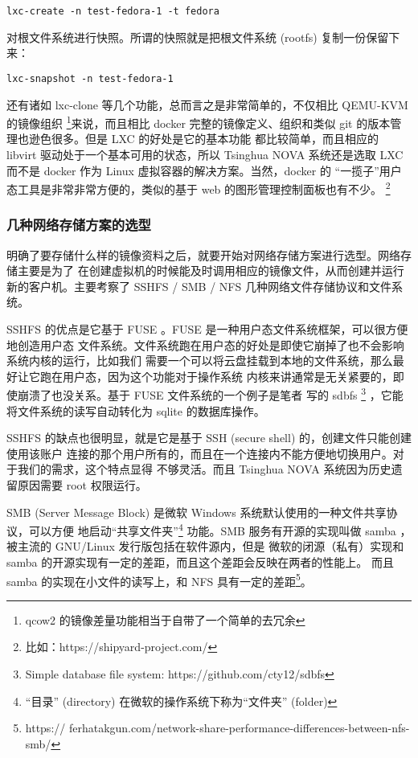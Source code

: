 \begin{lstlisting}
lxc-create -n test-fedora-1 -t fedora
\end{lstlisting}

对根文件系统进行快照。所谓的快照就是把根文件系统 (rootfs) 复制一份保留下来：

\begin{lstlisting}
lxc-snapshot -n test-fedora-1
\end{lstlisting}

还有诸如 lxc-clone 等几个功能，总而言之是非常简单的，不仅相比 QEMU-KVM 的镜像组织
\footnote{qcow2 的镜像差量功能相当于自带了一个简单的去冗余}来说，而且相比 docker
完整的镜像定义、组织和类似 git 的版本管理也逊色很多。但是 LXC 的好处是它的基本功能
都比较简单，而且相应的 libvirt 驱动处于一个基本可用的状态，所以 Tsinghua NOVA
系统还是选取 LXC 而不是 docker 作为 Linux 虚拟容器的解决方案。当然，docker 的
“一揽子”用户态工具是非常非常方便的，类似的基于 web 的图形管理控制面板也有不少。
\footnote{比如：https://shipyard-project.com/}

\subsubsection{几种网络存储方案的选型}
\label{subsubsec:network-storage}

明确了要存储什么样的镜像资料之后，就要开始对网络存储方案进行选型。网络存储主要是为了
在创建虚拟机的时候能及时调用相应的镜像文件，从而创建并运行新的客户机。主要考察了
SSHFS / SMB / NFS 几种网络文件存储协议和文件系统。

SSHFS 的优点是它基于 FUSE 。FUSE 是一种用户态文件系统框架，可以很方便地创造用户态
文件系统。文件系统跑在用户态的好处是即使它崩掉了也不会影响系统内核的运行，比如我们
需要一个可以将云盘挂载到本地的文件系统，那么最好让它跑在用户态，因为这个功能对于操作系统
内核来讲通常是无关紧要的，即使崩溃了也没关系。基于 FUSE 文件系统的一个例子是笔者
写的 sdbfs \footnote{Simple database file system:
https://github.com/cty12/sdbfs} ，它能将文件系统的读写自动转化为 sqlite 的数据库操作。

SSHFS 的缺点也很明显，就是它是基于 SSH (secure shell) 的，创建文件只能创建使用该账户
连接的那个用户所有的，而且在一个连接内不能方便地切换用户。对于我们的需求，这个特点显得
不够灵活。而且 Tsinghua NOVA 系统因为历史遗留原因需要 root 权限运行。

SMB (Server Message Block) 是微软 Windows 系统默认使用的一种文件共享协议，可以方便
地启动“共享文件夹”\footnote{“目录” (directory) 在微软的操作系统下称为“文件夹” (folder)}
功能。SMB 服务有开源的实现叫做 samba ，被主流的 GNU/Linux 发行版包括在软件源内，但是
微软的闭源（私有）实现和 samba 的开源实现有一定的差距，而且这个差距会反映在两者的性能上。
而且 samba 的实现在小文件的读写上，和 NFS 具有一定的差距\footnote{https://
ferhatakgun.com/network-share-performance-differences-between-nfs-smb/}。

